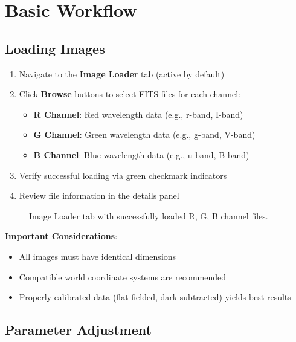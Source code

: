 \documentclass[11pt,a4paper]{article}
\begin{document}
\section{Basic Workflow}

\subsection{Loading Images}

\begin{enumerate}
\item Navigate to the \textbf{Image Loader} tab (active by default)
\item Click \textbf{Browse} buttons to select FITS files for each channel:
   \begin{itemize}
   \item \textbf{R Channel}: Red wavelength data (e.g., r-band, I-band)
   \item \textbf{G Channel}: Green wavelength data (e.g., g-band, V-band)
   \item \textbf{B Channel}: Blue wavelength data (e.g., u-band, B-band)
   \end{itemize}
\item Verify successful loading via green checkmark indicators
\item Review file information in the details panel
\end{enumerate}

\begin{figure}[H]
\centering
\caption{Image Loader tab with successfully loaded R, G, B channel files.}
\label{fig:image-loader}
\end{figure}

\textbf{Important Considerations}:
\begin{itemize}[leftmargin=*]
\item All images must have identical dimensions
\item Compatible world coordinate systems are recommended
\item Properly calibrated data (flat-fielded, dark-subtracted) yields best
results
\end{itemize}

\subsection{Parameter Adjustment}
\end{document}
